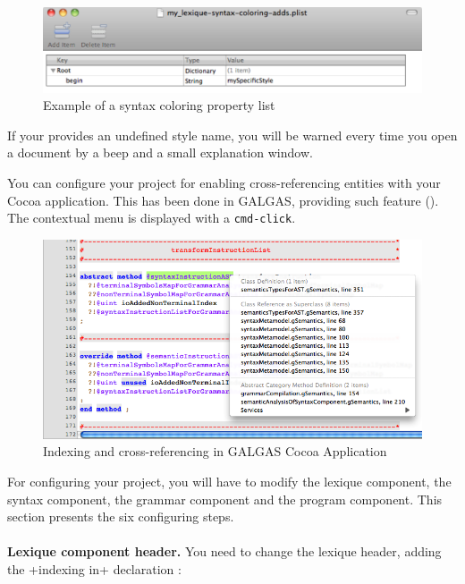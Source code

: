 \begin{figure}[t]
  \centering
  \includegraphics[width=15cm]{chapter-cocoa-features/custom-syntax-coloring-property-list-edition.pdf}
  \caption{Example of a syntax coloring property list}
  \ligne
\end{figure}

If your provides an undefined style name, you will be warned every time you open a document by a beep and a small explanation window.







You can configure your project for enabling cross-referencing entities with your Cocoa application. This has been done in GALGAS, providing such feature (). The contextual menu is displayed with a \texttt{cmd-click}.

\begin{figure}[t]
  \centering
  \includegraphics[width=16cm]{chapter-cocoa-features/indexing-sample.png}
  \caption{Indexing and cross-referencing in GALGAS Cocoa Application}
  \ligne
\end{figure}

For configuring your project, you will have to modify the lexique component, the syntax component, the grammar component and the program component. This section presents the six configuring steps.
 \\
 \\
 \textbf{Lexique component header.} You need to change the lexique header, adding the \ggs+indexing in+ declaration :


